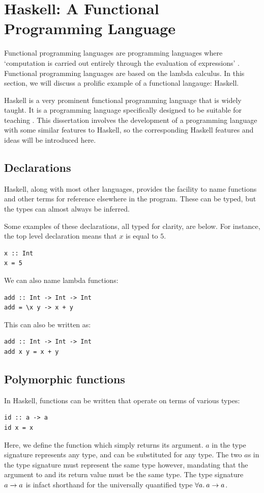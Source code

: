 \section{Haskell: A Functional Programming Language}
Functional programming languages are programming languages where `computation is carried out entirely through the evaluation of expressions' \cite{hudak1989conceptionfunctionalprogranning}. Functional programming languages are based on the lambda calculus. In this section, we will discuss a prolific example of a functional langauge: Haskell. 

Haskell is a very prominent functional programming language that is widely taught. It is a programming language specifically designed to be suitable for teaching \cite{hudak2007history}. This dissertation involves the development of a programming language with some similar features to Haskell, so the corresponding Haskell features and ideas will be introduced here. 

\subsection{Declarations}
Haskell, along with most other languages, provides the facility to name functions and other terms for reference elsewhere in the program. These can be typed, but the types can almost always be inferred. 

Some examples of these declarations, all typed for clarity, are below. For instance, the top level declaration means that $x$ is equal to $5$. 
\begin{lstlisting}[language=SFL]
x :: Int
x = 5
\end{lstlisting}
We can also name lambda functions:
\begin{lstlisting}[language=SFL]
add :: Int -> Int -> Int
add = \x y -> x + y
\end{lstlisting}
This can also be written as:
\begin{lstlisting}[language=SFL]
add :: Int -> Int -> Int
add x y = x + y
\end{lstlisting}
\subsection{Polymorphic functions}
In Haskell, functions can be written that operate on terms of various types:

\begin{lstlisting}[language=SFL]
id :: a -> a
id x = x
\end{lstlisting}
\noindent Here, we define the function  which simply returns its argument. $a$ in the type signature represents any type, and can be substituted for any type. The two $a$s in the type signature must represent the same type however, mandating that the argument to  and its return value must be the same type. The type signature $a \rightarrow a$ is infact shorthand for the universally quantified type $\forall a.\: a \rightarrow a$. 

